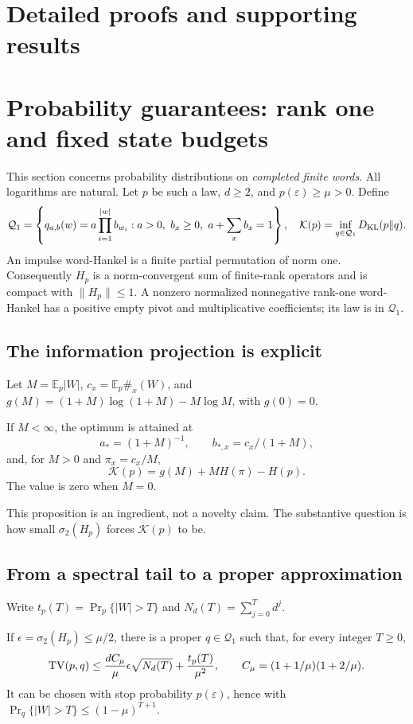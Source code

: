 \section*{Detailed proofs and supporting results}

\section{Probability guarantees: rank one and fixed state budgets}\label{II:U:sec:probability}
This section concerns probability distributions on \emph{completed finite
words}. All logarithms are natural. Let $p$ be such a law, $d\ge2$, and
$p(\varepsilon)\ge\mu>0$. Define
\[
 \mathcal Q_1=\left\{q_{a,b}(w)=a\prod_{i=1}^{|w|}b_{w_i}:
 a>0,\ b_x\ge0,\ a+\sum_xb_x=1\right\},\quad
 \mathcal K(p)=\inf_{q\in\mathcal Q_1}D_{\rm KL}(p\|q).
\]
An impulse word-Hankel is a finite partial permutation of norm one.
Consequently $H_p$ is a norm-convergent sum of finite-rank operators and is
compact with $\|H_p\|\le1$. A nonzero normalized nonnegative rank-one
word-Hankel has a positive empty pivot and multiplicative coefficients;
its law is in $\mathcal Q_1$.

\subsection{The information projection is explicit}
Let $M=\mathbb E_p|W|$, $c_x=\mathbb E_p\#_x(W)$, and
$g(M)=(1+M)\log(1+M)-M\log M$, with $g(0)=0$.
\begin{proposition}\label{II:U:prop:iprojection}
If $M<\infty$, the optimum is attained at
\[
 a_*=(1+M)^{-1},\qquad b_{*,x}=c_x/(1+M),
\]
and, for $M>0$ and $\pi_x=c_x/M$,
\[
 \mathcal K(p)=g(M)+M H(\pi)-H(p).
\]
The value is zero when $M=0$.
\end{proposition}

This proposition is an ingredient, not a novelty claim. The substantive
question is how small $\sigma_2(H_p)$ forces $\mathcal K(p)$ to be.

\subsection{From a spectral tail to a proper approximation}
Write $t_p(T)=\Pr_p\{|W|>T\}$ and $N_d(T)=\sum_{j=0}^Td^j$.
\begin{lemma}\label{II:U:lem:spectral-tv}
If $\epsilon=\sigma_2(H_p)\le\mu/2$, there is a proper
$q\in\mathcal Q_1$ such that, for every integer $T\ge0$,
\[
 \operatorname{TV}(p,q)\le \frac{dC_\mu}{\mu}\epsilon\sqrt{N_d(T)}
                    +\frac{t_p(T)}{\mu^2},\qquad
 C_\mu=(1+1/\mu)(1+2/\mu).
\]
It can be chosen with stop probability $p(\varepsilon)$, hence with
$\Pr_q\{|W|>T\}\le(1-\mu)^{T+1}$.
\end{lemma}



